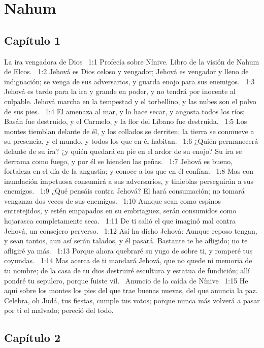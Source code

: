 \chapter{Nahum}
\section*{Capítulo 1 }
La ira vengadora de Dios  
1:1 Profecía sobre Nínive. Libro de la visión de Nahum de Elcos.  
1:2 Jehová es Dios celoso y vengador; Jehová es vengador y lleno de indignación; se venga de sus adversarios, y guarda enojo para sus enemigos.  
1:3 Jehová es tardo para la ira y grande en poder, y no tendrá por inocente al culpable. Jehová marcha en la tempestad y el torbellino, y las nubes son el polvo de sus pies.  
1:4 El amenaza al mar, y lo hace secar, y angosta todos los ríos; Basán fue destruido, y el Carmelo, y la flor del Líbano fue destruida.  
1:5 Los montes tiemblan delante de él, y los collados se derriten; la tierra se conmueve a su presencia, y el mundo, y todos los que en él habitan.  
1:6 ¿Quién permanecerá delante de su ira? ¿y quién quedará en pie en el ardor de su enojo? Su ira se derrama como fuego, y por él se hienden las peñas.  
1:7 Jehová es bueno, fortaleza en el día de la angustia; y conoce a los que en él confían.  
1:8 Mas con inundación impetuosa consumirá a sus adversarios, y tinieblas perseguirán a sus enemigos.  
1:9 ¿Qué pensáis contra Jehová? El hará consumación; no tomará venganza dos veces de sus enemigos.  
1:10 Aunque sean como espinos entretejidos, y estén empapados en su embriaguez, serán consumidos como hojarasca completamente seca.  
1:11 De ti salió el que imaginó mal contra Jehová, un consejero perverso.  
1:12 Así ha dicho Jehová: Aunque reposo tengan, y sean tantos, aun así serán talados, y él pasará. Bastante te he afligido; no te afligiré ya más.  
1:13 Porque ahora quebraré su yugo de sobre ti, y romperé tus coyundas.  
1:14 Mas acerca de ti mandará Jehová, que no quede ni memoria de tu nombre; de la casa de tu dios destruiré escultura y estatua de fundición; allí pondré tu sepulcro, porque fuiste vil.  
Anuncio de la caída de Nínive  
1:15 He aquí sobre los montes los pies del que trae buenas nuevas, del que anuncia la paz. Celebra, oh Judá, tus fiestas, cumple tus votos; porque nunca más volverá a pasar por ti el malvado; pereció del todo.  
\section*{Capítulo 2 }


